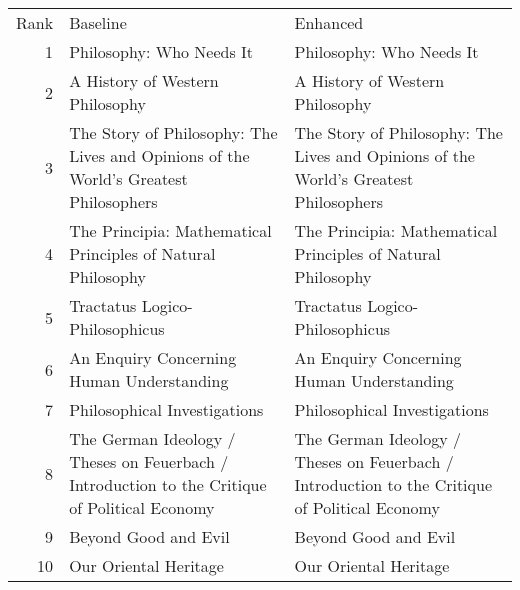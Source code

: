 \begin{tabular}{rll}
Rank & Baseline & Enhanced \\
1 & Philosophy: Who Needs It & Philosophy: Who Needs It \\
2 & A History of Western Philosophy & A History of Western Philosophy \\
3 & The Story of Philosophy: The Lives and Opinions of the World's Greatest Philosophers & The Story of Philosophy: The Lives and Opinions of the World's Greatest Philosophers \\
4 & The Principia: Mathematical Principles of Natural Philosophy & The Principia: Mathematical Principles of Natural Philosophy \\
5 & Tractatus Logico-Philosophicus & Tractatus Logico-Philosophicus \\
6 & An Enquiry Concerning Human Understanding & An Enquiry Concerning Human Understanding \\
7 & Philosophical Investigations & Philosophical Investigations \\
8 & The German Ideology / Theses on Feuerbach / Introduction to the Critique of Political Economy & The German Ideology / Theses on Feuerbach / Introduction to the Critique of Political Economy \\
9 & Beyond Good and Evil & Beyond Good and Evil \\
10 & Our Oriental Heritage & Our Oriental Heritage \\
\end{tabular}
